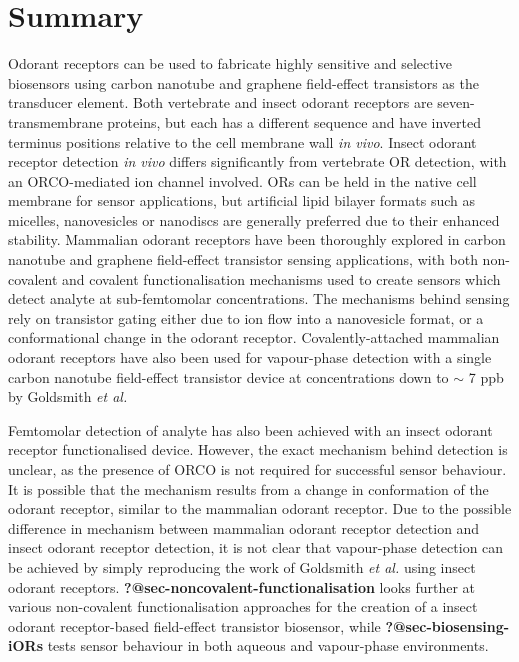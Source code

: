 \documentclass[
  a4paper,
]{scrbook}
\begin{document}
\hypertarget{summary}{%
\section{Summary}\label{summary}}

Odorant receptors can be used to fabricate highly sensitive and
selective biosensors using carbon nanotube and graphene field-effect
transistors as the transducer element. Both vertebrate and insect
odorant receptors are seven-transmembrane proteins, but each has a
different sequence and have inverted terminus positions relative to the
cell membrane wall \emph{in vivo}. Insect odorant receptor detection
\emph{in vivo} differs significantly from vertebrate OR detection, with
an ORCO-mediated ion channel involved. ORs can be held in the native
cell membrane for sensor applications, but artificial lipid bilayer
formats such as micelles, nanovesicles or nanodiscs are generally
preferred due to their enhanced stability. Mammalian odorant receptors
have been thoroughly explored in carbon nanotube and graphene
field-effect transistor sensing applications, with both non-covalent and
covalent functionalisation mechanisms used to create sensors which
detect analyte at sub-femtomolar concentrations. The mechanisms behind
sensing rely on transistor gating either due to ion flow into a
nanovesicle format, or a conformational change in the odorant receptor.
Covalently-attached mammalian odorant receptors have also been used for
vapour-phase detection with a single carbon nanotube field-effect
transistor device at concentrations down to \(\sim\) 7 ppb by Goldsmith
\emph{et al.}

Femtomolar detection of analyte has also been achieved with an insect
odorant receptor functionalised device. However, the exact mechanism
behind detection is unclear, as the presence of ORCO is not required for
successful sensor behaviour. It is possible that the mechanism results
from a change in conformation of the odorant receptor, similar to the
mammalian odorant receptor. Due to the possible difference in mechanism
between mammalian odorant receptor detection and insect odorant receptor
detection, it is not clear that vapour-phase detection can be achieved
by simply reproducing the work of Goldsmith \emph{et al.} using insect
odorant receptors. \textbf{?@sec-noncovalent-functionalisation} looks
further at various non-covalent functionalisation approaches for the
creation of a insect odorant receptor-based field-effect transistor
biosensor, while \textbf{?@sec-biosensing-iORs} tests sensor behaviour
in both aqueous and vapour-phase environments.
\end{document}
